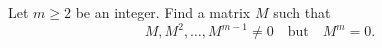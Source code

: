 \begin{exercise}
  \label{ex:hw03:prescribed-nilpotence-index}
  Let \(m\ge2\) be an integer. Find a matrix \(M\) such that
  \[
    M,M^2,\ldots,M^{m-1}\ne0\quad\text{but}\quad M^m=0.
  \]
\end{exercise}
